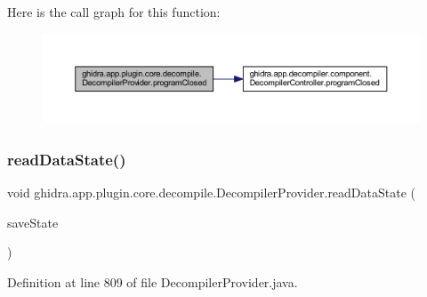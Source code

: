 Here is the call graph for this function\+:
\nopagebreak
\begin{figure}[H]
\begin{center}
\leavevmode
\includegraphics[width=350pt]{classghidra_1_1app_1_1plugin_1_1core_1_1decompile_1_1_decompiler_provider_a4745be510ce90f499664f2955f9ec3e4_cgraph}
\end{center}
\end{figure}
\mbox{\label{classghidra_1_1app_1_1plugin_1_1core_1_1decompile_1_1_decompiler_provider_ade6f2cf204e79466191b7b7045614f94}} 
\subsubsection{\texorpdfstring{readDataState()}{readDataState()}}
{\footnotesize\ttfamily void ghidra.\+app.\+plugin.\+core.\+decompile.\+Decompiler\+Provider.\+read\+Data\+State (\begin{DoxyParamCaption}\item[{Save\+State}]{save\+State }\end{DoxyParamCaption})\hspace{0.3cm}{\ttfamily [inline]}}



Definition at line 809 of file Decompiler\+Provider.\+java.

